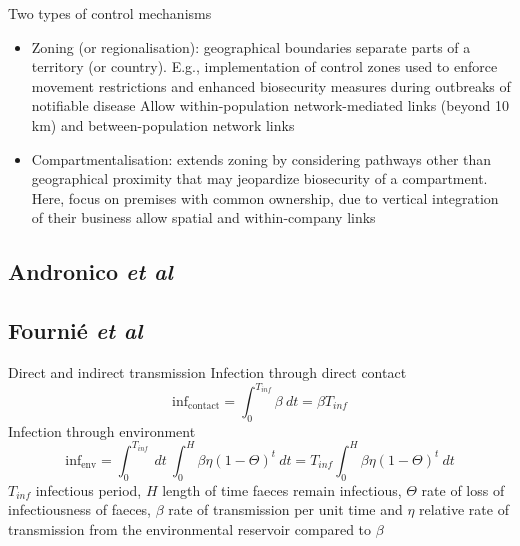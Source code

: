 \documentclass[aspectratio=43]{beamer}
\begin{document}
\begin{frame}{Two types of control mechanisms}
	\begin{itemize}
		\item Zoning (or regionalisation): geographical boundaries separate
		parts of a territory (or country). 
		E.g., implementation of control zones used to enforce movement restrictions and enhanced biosecurity measures during outbreaks of notifiable disease
		\newline
		Allow within-population network-mediated links (beyond 10 km) and between-population network links
		\vfill
		\item Compartmentalisation: extends zoning by considering pathways other than geographical proximity that may jeopardize biosecurity of a compartment. Here, focus on premises with common ownership, due to vertical integration of their business
		\newline
		allow spatial and within-company links
	\end{itemize}
\end{frame}


\subsection{Andronico \emph{et al}}

\subsection{Fourni\'e \emph{et al}}

\begin{frame}{Direct and indirect transmission}
	Infection through direct contact
	\[
		\text{inf}_\text{contact} = \int_{0}^{T_{inf}} \beta\ dt = \beta T_{inf}
	\]
	Infection through environment
	\[
		\text{inf}_\text{env} 
		= \int_0^{T_{inf}}\ dt\ \int_0^H \beta\eta(1-\Theta)^t\ dt
		= T_{inf}\int_0^H \beta\eta(1-\Theta)^t\ dt
	\]
	$T_{inf}$ infectious period, $H$ length of time faeces remain infectious, $\Theta$ rate of loss of infectiousness of faeces, $\beta$ rate of transmission per unit time and $\eta$ relative rate of transmission from the environmental reservoir compared to $\beta$
\end{frame}
\end{document}
